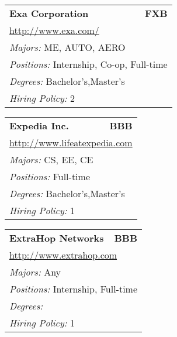 \documentclass[twoside]{article}
\begin{document}
\begin{center}
\begin{multicols}{3}
\begin{FlushLeft}
\begin{minipage}{.9\columnwidth}
\end{minipage}
 
\begin{minipage}{.9\columnwidth}\begin{tabularx}{.95\columnwidth}{Xr}
                 {\Large\bf Exa Corporation} & {\Large\bf FXB}\\
    \multicolumn{2}{p{.95\columnwidth}}{\url{http://www.exa.com/}}\\
    \multicolumn{2}{p{.95\columnwidth}}{\emph{Majors:} ME, AUTO, AERO}\\
    \multicolumn{2}{p{.95\columnwidth}}{\emph{Positions:} Internship, Co-op, Full-time}\\
    \multicolumn{2}{p{.95\columnwidth}}{\emph{Degrees:} Bachelor's,Master's}\\
    \multicolumn{2}{p{.95\columnwidth}}{\emph{Hiring Policy:} 2}\\
    \end{tabularx}
    
\end{minipage}
 
\begin{minipage}{.9\columnwidth}\begin{tabularx}{.95\columnwidth}{Xr}
                 {\Large\bf Expedia Inc.} & {\Large\bf BBB}\\
    \multicolumn{2}{p{.95\columnwidth}}{\url{http://www.lifeatexpedia.com}}\\
    \multicolumn{2}{p{.95\columnwidth}}{\emph{Majors:} CS, EE, CE}\\
    \multicolumn{2}{p{.95\columnwidth}}{\emph{Positions:} Full-time}\\
    \multicolumn{2}{p{.95\columnwidth}}{\emph{Degrees:} Bachelor's,Master's}\\
    \multicolumn{2}{p{.95\columnwidth}}{\emph{Hiring Policy:} 1}\\
    \end{tabularx}
    
\end{minipage}
 
\begin{minipage}{.9\columnwidth}\begin{tabularx}{.95\columnwidth}{Xr}
                 {\Large\bf ExtraHop Networks} & {\Large\bf BBB}\\
    \multicolumn{2}{p{.95\columnwidth}}{\url{http://www.extrahop.com}}\\
    \multicolumn{2}{p{.95\columnwidth}}{\emph{Majors:} Any}\\
    \multicolumn{2}{p{.95\columnwidth}}{\emph{Positions:} Internship, Full-time}\\
    \multicolumn{2}{p{.95\columnwidth}}{\emph{Degrees:} }\\
    \multicolumn{2}{p{.95\columnwidth}}{\emph{Hiring Policy:} 1}\\
    \end{tabularx}
    

\end{minipage}
\end{FlushLeft}
\end{multicols}
\end{center}
\end{document}

